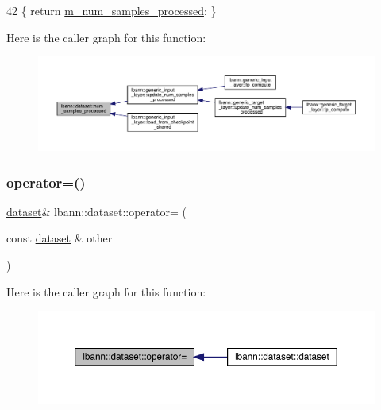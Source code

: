 \begin{DoxyCode}
42 \{ \textcolor{keywordflow}{return} \hyperlink{classlbann_1_1dataset_a68f4120cc4a7837e6a95b01358210cb5}{m\_num\_samples\_processed}; \}
\end{DoxyCode}
Here is the caller graph for this function\+:\nopagebreak
\begin{figure}[H]
\begin{center}
\leavevmode
\includegraphics[width=350pt]{classlbann_1_1dataset_a412b29a50638f7d8feea4ad368c6a4dc_icgraph}
\end{center}
\end{figure}
\mbox{\label{classlbann_1_1dataset_a8806c93d49b1171a98f61f67de964f2b}} 
\subsubsection{\texorpdfstring{operator=()}{operator=()}}
{\footnotesize\ttfamily \hyperlink{classlbann_1_1dataset}{dataset}\& lbann\+::dataset\+::operator= (\begin{DoxyParamCaption}\item[{const \hyperlink{classlbann_1_1dataset}{dataset} \&}]{other }\end{DoxyParamCaption})\hspace{0.3cm}{\ttfamily [default]}}

Here is the caller graph for this function\+:\nopagebreak
\begin{figure}[H]
\begin{center}
\leavevmode
\includegraphics[width=350pt]{classlbann_1_1dataset_a8806c93d49b1171a98f61f67de964f2b_icgraph}
\end{center}
\end{figure}
\mbox{\label{classlbann_1_1dataset_ab951c879f151990613567e985fe1e278}} 
